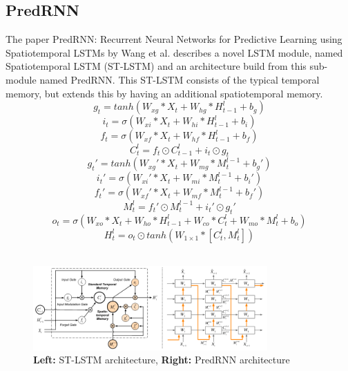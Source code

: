  \subsection{PredRNN} \label{subsection::PredRNN}
  The paper \glqq PredRNN: Recurrent Neural Networks for Predictive Learning using Spatiotemporal LSTMs\grqq{} by Wang et al. \cite{Wang2017} describes a novel
  LSTM module, named Spatiotemporal LSTM (ST-LSTM) and an architecture build from this sub-module named PredRNN.
  This ST-LSTM consists of the typical temporal memory, but extends this by having an additional spatiotemporal memory.
  \begin{equation}
   g_t = tanh(W_{xg} \ast X_t + W_{hg} \ast H_{t-1}^l + b_g)
  \end{equation}
  \begin{equation}
   i_t = \sigma(W_{xi} \ast X_t + W_{hi} \ast H_{t-1}^l +b_i)
  \end{equation}
  \begin{equation}
   f_t = \sigma(W_{xf} \ast X_t + W_{hf} \ast H_{t-1}^l + b_f)
  \end{equation}
  \begin{equation}
   C_t^l = f_t \odot C_{t-1}^l + i_t \odot g_t
  \end{equation}
  \begin{equation}
   g_t\prime = tanh(W_{xg}\prime \ast X_t + W_{mg} \ast M_t^{l-1} + b_g\prime)
  \end{equation}
  \begin{equation}
   i_t\prime = \sigma(W_{xi}\prime \ast X_t + W_{mi} \ast M_t^{l-1} + b_i\prime)
  \end{equation}
  \begin{equation}
   f_t\prime = \sigma(W_{xf}\prime \ast X_t + W_{mf} \ast M_t^{l-1} + b_f\prime)
  \end{equation}
  \begin{equation}
   M_t^l = f_t\prime \odot M_t^{l-1} + i_t\prime \odot g_t\prime
  \end{equation}
  \begin{equation}
   o_t = \sigma(W_{xo} \ast X_t + W_{ho} \ast H_{t-1}^l + W_{co} \ast C_t^l + W_{mo} \ast M_t^l + b_o)
  \end{equation}
  \begin{equation}
   H_t^l = o_t \odot tanh(W_{1 \times 1} \ast [C_t^l, M_t^l])
  \end{equation}\noindent\\
  \begin{figure}[H]
   \includegraphics[width=0.8\textwidth]{../Images/wang.png}
   \centering
   \caption{\textbf{Left:} ST-LSTM architecture, \textbf{Right:} PredRNN architecture \cite{Wang2017}}
   \label{fig:wang_architecture}
  \end{figure}\noindent
